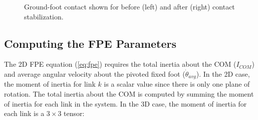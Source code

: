 \begin{figure}[!h]
	\begin{center}
	\end{center}
  	\caption{Ground-foot contact shown for before (left) and after (right) contact stabilization.}
	\label{fig:contact_stabilization}
\end{figure}




\subsection{Computing the FPE Parameters} %
\label{sub:computing_fpe_parameters}
The 2D FPE equation (\ref{eq:fpe}) requires the total inertia about the COM ($I_{COM}$) and average angular velocity about the pivoted fixed foot ($\dot{\theta}_{avg}$). In the 2D case, the moment of inertia for link $k$ is a scalar value since there is only one plane of rotation. The total inertia about the COM is computed by summing the moment of inertia for each link in the system. In the 3D case, the moment of inertia for each link is a $3\times3$ tensor: 


